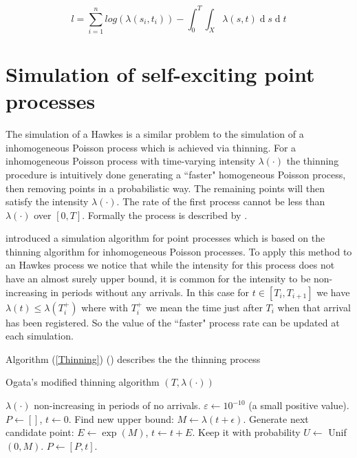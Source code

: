 \documentclass[11pt,a4paper]{article}
\renewcommand{\d}[1]{\ensuremath{\operatorname{d}\!{#1}}}
\begin{document}
\begin{equation*}
    l = \sum_{i=1}^n log(\lambda(s_i, t_i)) - \int_0^T\int_X \lambda(s,t) \d s \d t
\end{equation*}







\section{Simulation of self-exciting point processes}

The simulation of a Hawkes is a similar problem to the simulation of a inhomogeneous Poisson process which is achieved via thinning. For a inhomogeneous Poisson process with time-varying intensity $\lambda(\cdot)$ the thinning procedure is intuitively done generating a ``faster" homogeneous Poisson process, then removing points in a probabilistic way. The remaining points will then satisfy the intensity $\lambda(\cdot)$. The rate of the first process cannot be less than $\lambda(\cdot)$ over $[0, T]$. Formally the process is described by \cite{Lewis}.

\cite{Ogata81} introduced a simulation algorithm for point processes which is based on the thinning algorithm for inhomogeneous Poisson processes. To apply this method to an Hawkes process we notice that while the intensity for this process does not have an almost surely upper bound, it is common for the intensity to be non-increasing in periods without any arrivals. In this case for $t \in [T_i, T_{i+1}]$ we have $\lambda(t) \leq \lambda (T^+_i)$ where with $T^+_i$ we mean the time just after $T_i$ when that arrival has been registered. So the value of the ``faster" process rate can be updated at each simulation.

Algorithm (\ref{Thinning}) (\cite{Laub}) describes the the thinning process 


\begin{algorithm}[H]
    \caption{Ogata's modified thinning algorithm $(T, \lambda(\cdot))$}\label{Thinning}
    \begin{algorithmic}
        \Require
            \Statex $\lambda(\cdot)$ non-increasing in periods of no arrivals.
            \Statex $\varepsilon \gets 10^{-10}$ (a small positive value).
            \Statex $P \gets []$, $t \gets 0$.
            \State Find new upper bound: $M \gets \lambda(t + \epsilon)$.
            \State Generate next candidate point: $E \gets \exp(M)$, $t \gets t + E$.
            \State Keep it with probability $U \gets$ Unif $(0, M)$.
                \State $P \gets [P, t]$.
            \EndIf
        \EndWhile
        \State {}
    \end{algorithmic}
\end{algorithm}
\end{document}
